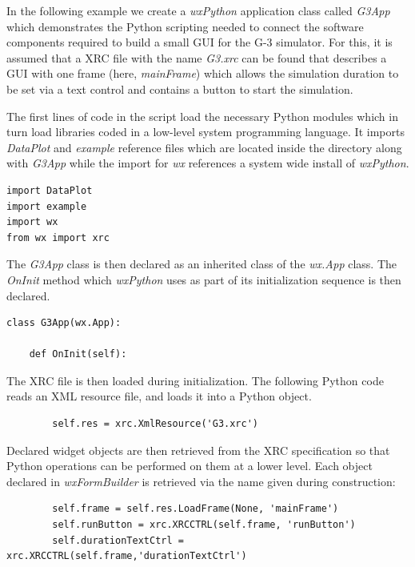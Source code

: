 \documentclass[12pt]{article}
\begin{document}
In the following example we create a {\it wxPython} application class 
called {\it G3App} which demonstrates the Python scripting needed to 
connect the software components required to build a small GUI for 
the G-3 simulator.  For this, it is assumed that a XRC file with the name
{\it G3.xrc} can be found that describes a GUI with one frame (here,
{\it mainFrame}) which allows the simulation duration to be set via a
text control and contains a button to start the simulation.

The first lines of code in the script load the necessary Python
modules which in turn load libraries coded in a low-level system
programming language. It imports {\it DataPlot} and {\it example} 
reference files which are located inside the directory along with {\it G3App} while 
the import for {\it wx} references a system wide install of {\it wxPython}.

{\footnotesize
  \linenumbers*
\begin{verbatim}
import DataPlot
import example
import wx
from wx import xrc
\end{verbatim}
}

The  {\it G3App} class is then declared as an inherited class of the {\it wx.App} class. The {\it OnInit} method which {\it wxPython} uses as part of its
initialization sequence is then declared.

{\footnotesize
\linenumbers
 \begin{verbatim}
class G3App(wx.App):

    def OnInit(self):
 \end{verbatim}
}

The XRC file is then loaded during initialization.
The following Python code reads an XML resource file, and loads it
into a Python object.

{\footnotesize
   \linenumbers
 \begin{verbatim}
        self.res = xrc.XmlResource('G3.xrc')
 \end{verbatim}
}

Declared widget objects are then retrieved from the XRC 
specification so that Python operations can be performed on them at a 
lower level. Each object declared in {\it wxFormBuilder} is retrieved 
via the name given during construction:

{\footnotesize
   \linenumbers
 \begin{verbatim}
        self.frame = self.res.LoadFrame(None, 'mainFrame')
        self.runButton = xrc.XRCCTRL(self.frame, 'runButton')
        self.durationTextCtrl = xrc.XRCCTRL(self.frame,'durationTextCtrl')
 \end{verbatim}
}
\end{document}
